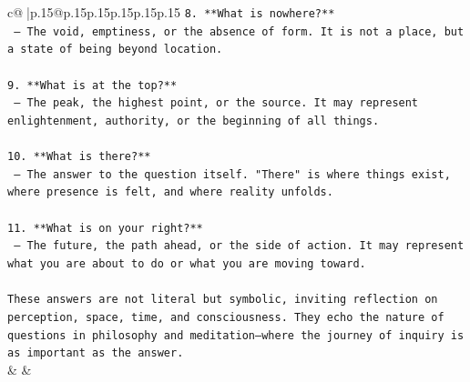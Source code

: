 \documentclass{article}
\begin{document}
{\begin{supertabular}{c@{$\;$}|p{.15\linewidth}@{}p{.15\linewidth}p{.15\linewidth}p{.15\linewidth}p{.15\linewidth}p{.15\linewidth}}
{{{\texttt{8. **What is nowhere?**  } \\
\texttt{   — The void, emptiness, or the absence of form. It is not a place, but a state of being beyond location.} \\
\\ 
\texttt{9. **What is at the top?**  } \\
\texttt{   — The peak, the highest point, or the source. It may represent enlightenment, authority, or the beginning of all things.} \\
\\ 
\texttt{10. **What is there?**  } \\
\texttt{   — The answer to the question itself. "There" is where things exist, where presence is felt, and where reality unfolds.} \\
\\ 
\texttt{11. **What is on your right?**  } \\
\texttt{   — The future, the path ahead, or the side of action. It may represent what you are about to do or what you are moving toward.} \\
\\ 
\texttt{These answers are not literal but symbolic, inviting reflection on perception, space, time, and consciousness. They echo the nature of questions in philosophy and meditation—where the journey of inquiry is as important as the answer.} \\
            }
        }
    }
    & & \\ \\


\end{supertabular}}
\end{document}
